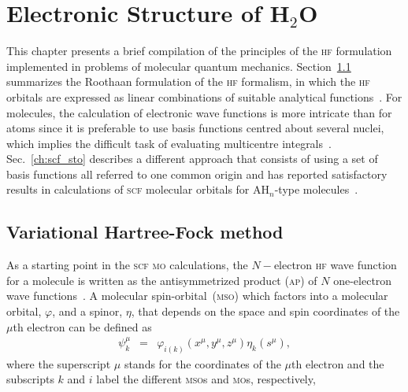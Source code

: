 \chapter{Electronic Structure of H$_{2}$O}
\label{cha:scf_h2o}





This chapter presents a brief compilation of the principles of the
\textsc{hf} formulation implemented in problems of molecular quantum
mechanics. Section~\ref{ch:var_hf} summarizes the Roothaan formulation
of the \textsc{hf} formalism, in which the \textsc{hf} orbitals are
expressed as linear combinations of suitable analytical
functions~\cite{Roothaan_HF}. For molecules, the calculation of
electronic wave functions is more intricate than for atoms since it is
preferable to use basis functions centred about several nuclei, which
implies the difficult task of evaluating multicentre
integrals~\cite{Pitzer_1968,Pitzer_1970}. Sec.~\ref{ch:scf_sto}
describes a different approach that consists of using a set of basis
functions all referred to one common origin and has reported
satisfactory results in calculations of \textsc{scf} molecular
orbitals for AH$_{n}$-type molecules~\cite{Moccia_JCP_2164,
  Moccia_1964}.


\section{Variational Hartree-Fock method}
\label{ch:var_hf}





As a starting point in the \textsc{scf} \textsc{mo} calculations, the
$N-$electron \textsc{hf} wave function for a molecule is written as
the antisymmetrized product (\textsc{ap}) of $N$ one-electron wave
functions~\cite{Roothaan_HF}. A molecular spin-orbital~(\textsc{mso})
which factors into a molecular orbital, $\varphi$, and a spinor,
$\eta$, that depends on the space and spin coordinates of the $\mu$th
electron can be defined as
%
\begin{eqnarray}
  \psi_{k}^{\mu} & = & \varphi_{i(k)}(x^{\mu}, y^{\mu}, z^{\mu})
  \eta_{k}(s^{\mu}),
  \label{eq:mso}
\end{eqnarray}
%
where the superscript $\mu$ stands for the coordinates of the $\mu$th
electron and the subscripts $k$ and $i$ label the different
\textsc{mso}s and \textsc{mo}s, respectively,

